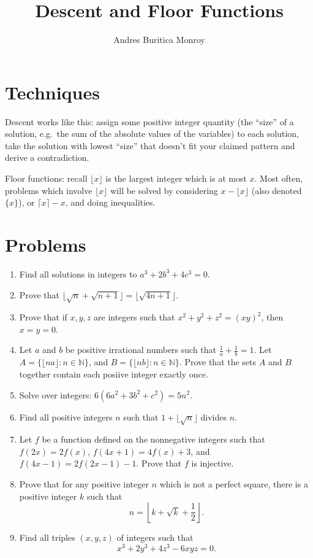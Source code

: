 \documentclass{article}
\title{Descent and Floor Functions}
\author{Andres Buritica Monroy}
\date{}
\begin{document}
\maketitle
\section{Techniques}
  Descent works like this: assign some positive integer quantity
  (the ``size'' of a solution, e.g.\ the sum of the absolute values of the
  variables) to each solution, take the solution with lowest
  ``size'' that doesn't fit your claimed pattern and derive a contradiction.

  Floor functions: recall $\lfloor x\rfloor$ is the largest integer which is at
  most $x$. Most often, problems which involve $\lfloor x\rfloor$ will be
  solved by considering $x-\lfloor x\rfloor$ (also denoted $\{x\}$), or $\lceil
  x\rceil-x$, and doing inequalities.
\section{Problems}
\begin{enumerate}
  \item Find all solutions in integers to $a^3+2b^3+4c^3=0$.
  \item Prove that $\lfloor\sqrt n+\sqrt{n+1}\rfloor=\lfloor\sqrt{4n+1}\rfloor$.
  \item Prove that if $x, y, z$ are integers such that $x^2+y^2+z^2=(xy)^2$,
      then $x=y=0$.
  \item Let $a$ and $b$ be positive irrational numbers such that $\frac 1a+\frac 1b=1$.
    Let $A=\{\lfloor na\rfloor: n\in\mathbb N\}$, and $B=\{\lfloor nb\rfloor:
    n\in\mathbb N\}$. Prove that the sets $A$ and $B$ together contain each
    posiive integer exactly once.
  \item Solve over integers: $6(6a^2 + 3b^2 + c^2) = 5n^2$.
  \item Find all positive integers $n$ such that $1+\lfloor\sqrt n\rfloor$
    divides $n$.
  \item Let $f$ be a function defined on the nonnegative integers such that
    $f(2x)=2f(x)$, $f(4x+1)=4f(x)+3$, and $f(4x-1)=2f(2x-1)-1$. Prove that $f$
    is injective.
  \item Prove that for any positive integer $n$ which is not a perfect square,
    there is a positive integer $k$ such that
    \[n=\left\lfloor k+\sqrt k+\frac12\right\rfloor.\]
  \item Find all triples $(x, y, z)$ of integers such that
    \[x^3 + 2y^3 + 4z^3 - 6xyz = 0.\]
\end{enumerate}
\newpage
\end{document}

